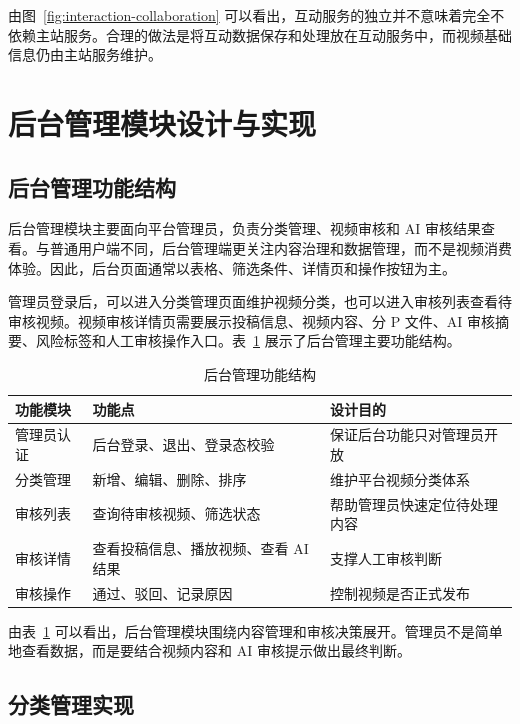 由图~\ref{fig:interaction-collaboration} 可以看出，互动服务的独立并不意味着完全不依赖主站服务。合理的做法是将互动数据保存和处理放在互动服务中，而视频基础信息仍由主站服务维护。

\section{后台管理模块设计与实现}
\label{sec:admin-module-implementation}

\subsection{后台管理功能结构}
\label{subsec:admin-module-structure}

后台管理模块主要面向平台管理员，负责分类管理、视频审核和 AI 审核结果查看。与普通用户端不同，后台管理端更关注内容治理和数据管理，而不是视频消费体验。因此，后台页面通常以表格、筛选条件、详情页和操作按钮为主。

管理员登录后，可以进入分类管理页面维护视频分类，也可以进入审核列表查看待审核视频。视频审核详情页需要展示投稿信息、视频内容、分 P 文件、AI 审核摘要、风险标签和人工审核操作入口。表~\ref{tab:admin-function-structure} 展示了后台管理主要功能结构。

\begin{table}[htbp]
  \centering
  \caption{后台管理功能结构}
  \label{tab:admin-function-structure}
  \begin{tabular}{p{}p{}p{}}
    \hline
    \textbf{功能模块} & \textbf{功能点} & \textbf{设计目的} \\
    \hline
    管理员认证 & 后台登录、退出、登录态校验 & 保证后台功能只对管理员开放 \\
    分类管理 & 新增、编辑、删除、排序 & 维护平台视频分类体系 \\
    审核列表 & 查询待审核视频、筛选状态 & 帮助管理员快速定位待处理内容 \\
    审核详情 & 查看投稿信息、播放视频、查看 AI 结果 & 支撑人工审核判断 \\
    审核操作 & 通过、驳回、记录原因 & 控制视频是否正式发布 \\
    \hline
  \end{tabular}
\end{table}

由表~\ref{tab:admin-function-structure} 可以看出，后台管理模块围绕内容管理和审核决策展开。管理员不是简单地查看数据，而是要结合视频内容和 AI 审核提示做出最终判断。

\subsection{分类管理实现}
\label{subsec:category-management-implementation}

